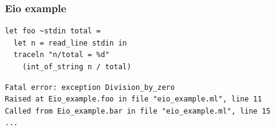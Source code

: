 \documentclass{beamer}
\begin{document}
\begin{frame}[fragile]
	\frametitle{Eio example}
\begin{lstlisting}[style=ocaml]
let foo ~stdin total =
  let n = read_line stdin in
  traceln "n/total = %d"
    (int_of_string n / total)
\end{lstlisting}
\begin{lstlisting}[style=output]
Fatal error: exception Division_by_zero
Raised at Eio_example.foo in file "eio_example.ml", line 11
Called from Eio_example.bar in file "eio_example.ml", line 15
...
\end{lstlisting}
\end{frame}
\end{document}
